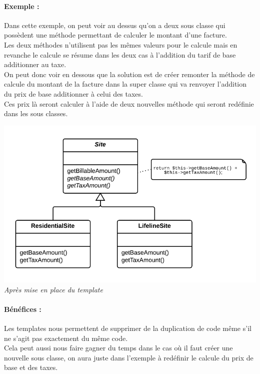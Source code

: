 \documentclass[a4paper,twoside,12pt,openright]{report}
\begin{document}
\paragraph{Exemple :}
Dans cette exemple, on peut voir au dessus qu'on a deux sous classe qui possèdent une méthode permettant de calculer le montant d'une facture.\\
Les deux méthodes n'utilisent pas les mêmes valeurs pour le calcule mais en revanche le calcule se résume dans les deux cas à l'addition du tarif de base additionner au taxe.\\
On peut donc voir en dessous que la solution est de créer remonter la méthode de calcule du montant de la facture dans la super classe qui va renvoyer l'addition du prix de base additionner à celui des taxes.\\
Ces prix là seront calculer à l'aide de deux nouvelles méthode qui seront redéfinie dans les sous classes.\\

\begin{center}
\includegraphics[scale=0.75]{Image/Template2.png}\\
\itshape{Après mise en place du template \cite{ref5}}
\end{center}

\paragraph{Bénéfices :}
Les templates nous permettent de supprimer de la duplication de code même s'il ne s'agit pas exactement du même code.\\
Cela peut aussi nous faire gagner du temps dans le cas où il faut créer une nouvelle sous classe, on aura juste dans l'exemple à redéfinir le calcule du prix de base et des taxes.\\
\end{document}
